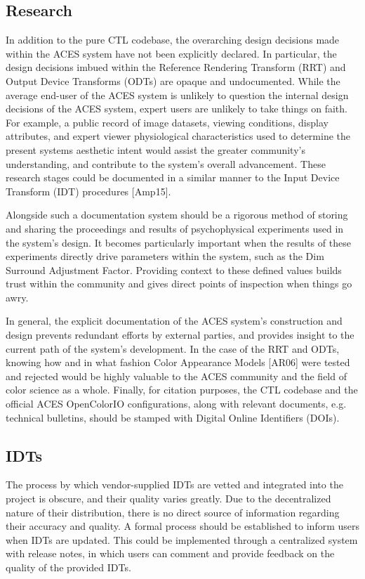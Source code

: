 \documentclass[conference]{IEEEtran}
\begin{document}
\subsection{Research}
In addition to the pure CTL codebase, the overarching design decisions made within the ACES system have not been explicitly declared. In particular, the design decisions imbued within the Reference Rendering Transform (RRT) and Output Device Transforms (ODTs) are opaque and undocumented. While the average end-user of the ACES system is unlikely to question the internal design decisions of the ACES system, expert users are unlikely to take things on faith. For example, a public record of image datasets, viewing conditions, display attributes, and expert viewer physiological characteristics used to determine the present systems aesthetic intent would assist the greater community's understanding, and contribute to the system's overall advancement. These research stages could be documented in a similar manner to the Input Device Transform (IDT) procedures [Amp15].

Alongside such a documentation system should be a rigorous method of storing and sharing the proceedings and results of psychophysical experiments used in the system's design. It becomes particularly important when the results of these experiments directly drive parameters within the system, such as the Dim Surround Adjustment Factor. Providing context to these defined values builds trust within the community and gives direct points of inspection when things go awry. 

In general, the explicit documentation of the ACES system's construction and design prevents redundant efforts by external parties, and provides insight to the current path of the system's development. In the case of the RRT and ODTs, knowing how and in what fashion Color Appearance Models [AR06] were tested and rejected would be highly valuable to the ACES community and the field of color science as a whole. Finally, for citation purposes, the CTL codebase and the official ACES OpenColorIO configurations, along with relevant documents, e.g. technical bulletins, should be stamped with Digital Online Identifiers (DOIs).

\subsection{IDTs}
The process by which vendor-supplied IDTs are vetted and integrated into the project is obscure, and their quality varies greatly. Due to the decentralized nature of their distribution, there is no direct source of information regarding their accuracy and quality. A formal process should be established to inform users when IDTs are updated. This could be implemented through a centralized system with release notes, in which users can comment and provide feedback on the quality of the provided IDTs.
\end{document}
